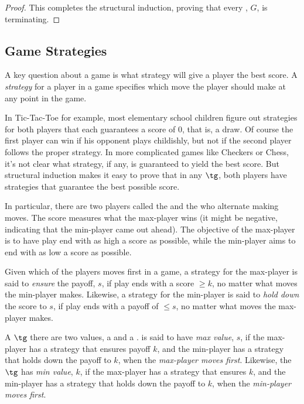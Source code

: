 \begin{definition}
\begin{proof}
This completes the structural induction, proving that every \tg, $G$, is
terminating.
\end{proof}


\subsection{Game Strategies}

A key question about a game is what strategy will give a player the best
score.  A \emph{strategy} for a player in a game specifies which move the
player should make at any point in the game.

In Tic-Tac-Toe for example, most elementary school children figure out
strategies for both players that each guarantees a score of 0, that is, a
draw.  Of course the first player can win if his opponent plays
childishly, but not if the second player follows the proper strategy.  In
more complicated games like Checkers or Chess, it's not clear what
strategy, if any, is guaranteed to yield the best score.
But structural induction makes it easy to prove that in any $\tg$,
both players have strategies that guarantee the best possible score.

In particular, there are two players called the  and the
 who alternate making moves.  The score measures what the
max-player wins (it might be negative, indicating that the min-player came
out ahead).  The objective of the max-player is to have play end with as
high a score as possible, while the min-player aims to end with as low a
score as possible.

Given which of the players moves first in a game, a strategy for the
max-player is said to \emph{ensure} the payoff, $s$, if play ends with a
score $ \ge k$, no matter what moves the min-player makes.  Likewise, a
strategy for the min-player is said to \emph{hold down} the score to $s$,
if play ends with a payoff of $\le s$, no matter what moves the max-player
makes.

A $\tg$ there are two values, a  and a .   is said to have \emph{max value}, $s$, if the max-player has a
strategy that ensures payoff $k$, and the min-player has a strategy that
holds down the payoff to $k$, when the \emph{max-player moves first}.
Likewise, the $\tg$ has \emph{min value}, $k$, if the max-player has a
strategy that ensures $k$, and the min-player has a strategy that holds
down the payoff to $k$, when the \emph{min-player moves first}.


\end{definition}
